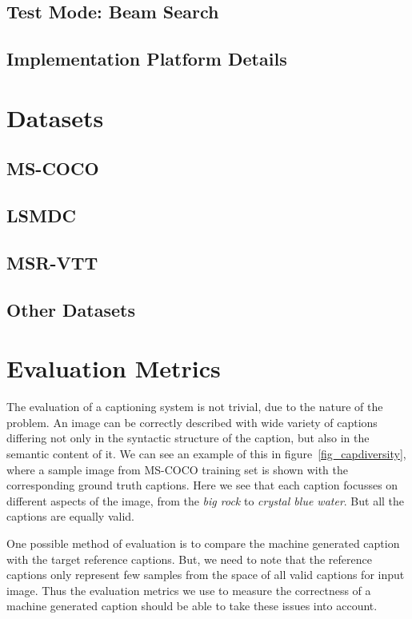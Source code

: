\subsection{Test Mode: Beam Search}
\subsection{Implementation Platform Details}
\section{Datasets}
\subsection{MS-COCO}
\subsection{LSMDC}
\subsection{MSR-VTT}
\subsection{Other Datasets}
\section{Evaluation Metrics}
The evaluation of a captioning system is not trivial, due to the
 nature of the problem.
An image can be correctly described with wide variety of captions differing not
only in the syntactic structure of the caption, but also in the semantic content
of it.
We can see an example of this in figure~\ref{fig_capdiversity}, where a sample
image from MS-COCO training set is shown with the corresponding ground truth
captions.
Here we see that each caption focusses on different aspects of the image, from
the \emph{big rock} to \emph{crystal blue water}.
But all the captions are equally valid.

One possible method of evaluation is to compare the machine generated
caption with the target reference captions.
But, we need to note that the reference captions only represent few samples from
the space of all valid captions for input image.
Thus the evaluation metrics we use to measure the correctness of a machine
generated caption should be able to take these issues into account.

